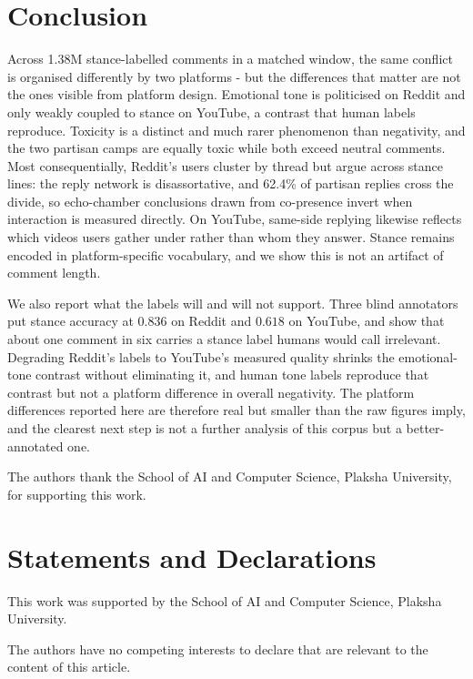 \documentclass[pdflatex,sn-basic,Numbered,iicol]{sn-jnl}
\begin{document}
\section{Conclusion}
Across 1.38M stance-labelled comments in a matched window, the same conflict is
organised differently by two platforms - but the differences that matter are not the
ones visible from platform design. Emotional tone is politicised on Reddit and only
weakly coupled to stance on YouTube, a contrast that human labels reproduce.
Toxicity is a distinct and much rarer phenomenon than negativity, and the two
partisan camps are equally toxic while both exceed neutral comments. Most consequentially, Reddit's users cluster by thread but
argue across stance lines: the reply network is disassortative, and 62.4\% of
partisan replies cross the divide, so echo-chamber conclusions drawn from co-presence
invert when interaction is measured directly. On YouTube, same-side replying likewise
reflects which videos users gather under rather than whom they answer. Stance remains encoded in
platform-specific vocabulary, and we show this is not an artifact of comment length.

We also report what the labels will and will not support. Three blind annotators put
stance accuracy at $0.836$ on Reddit and $0.618$ on YouTube, and show that about one
comment in six carries a stance label humans would call irrelevant. Degrading Reddit's
labels to YouTube's measured quality shrinks the emotional-tone contrast without
eliminating it, and human tone labels reproduce that contrast but not a platform
difference in overall negativity. The platform differences reported here are therefore real but smaller
than the raw figures imply, and the clearest next step is not a further analysis of
this corpus but a better-annotated one.

\backmatter

The authors thank the School of AI and Computer Science, Plaksha University, for
supporting this work.

\section*{Statements and Declarations}

This work was supported by the School of AI and Computer Science, Plaksha
University.

The authors have no competing interests to declare that are relevant to the
content of this article.
\end{document}
